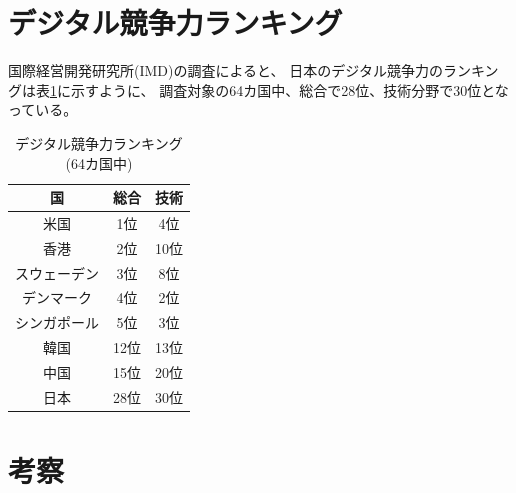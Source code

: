 \documentclass[a4paper,11pt,dvipdfmx]{ujarticle}
\begin{document}
\section{デジタル競争力ランキング}

国際経営開発研究所(IMD)の調査\cite{imd}によると、
日本のデジタル競争力のランキングは表\ref{tbl:ランキング}に示すように、
調査対象の64カ国中、総合で28位、技術分野で30位となっている。

\begin{table}[htbp]
    \centering
    \caption{デジタル競争力ランキング(64カ国中)}
    \label{tbl:ランキング}

    \begin{tabular}{|c|c|c|}\hline
        国 & 総合 & 技術 \\
        \hline
        米国 & 1位 & 4位 \\
        \hline
        香港 & 2位 & 10位 \\
        \hline
        スウェーデン & 3位 & 8位 \\
        \hline
        デンマーク & 4位 & 2位 \\
        \hline
        シンガポール & 5位 & 3位 \\
        \hline
        \hline
        韓国 & 12位 & 13位 \\
        \hline
        中国 & 15位 & 20位 \\
        \hline
        \hline
        日本 & 28位 & 30位 \\
        \hline
    \end{tabular}
\end{table}

%
\section{考察}
\end{document}
